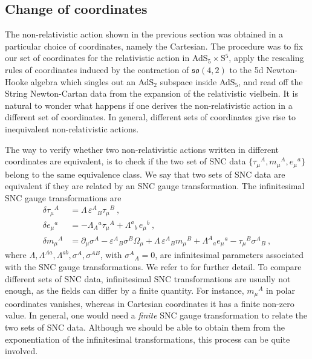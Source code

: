 \documentclass[12pt]{article}
\numberwithin{equation}{section}
\begin{document}
\subsection{Change of coordinates}

The non-relativistic action shown in the previous section was obtained in a particular choice of coordinates, namely the Cartesian. The procedure was to fix our set of coordinates for the relativistic action in AdS$_5\times$S$^5$, apply the rescaling rules of coordinates induced by the contraction of $\mathfrak{so}(4,2)$ to the 5d Newton-Hooke algebra which singles out an AdS$_2$ subspace inside AdS$_5$, and read off the String Newton-Cartan data from the expansion of the relativistic vielbein. It is natural to wonder what happens if one derives the non-relativistic action in a different set of coordinates. In general, different sets of coordinates give rise to inequivalent non-relativistic actions.

The way to verify whether two non-relativistic actions written in different coordinates are equivalent, is to check if the two set of SNC data $\{ \tau_{\mu}{}^A, m_{\mu}{}^A, e_{\mu}{}^a \}$ belong to the same equivalence class. We say that two sets of SNC data are equivalent if they are related by an SNC gauge transformation.
The infinitesimal SNC gauge transformations are
\begin{align}
     \delta \tau_{\mu}{}^A &= \Lambda \,\varepsilon^A{}_B \tau_{\mu}{}^B \ ,  \\
     \delta e_\mu{}^{a} &= - \Lambda_A{}^{a} \tau_\mu{}^A + \Lambda^{a}{}_{b} \, e_\mu{}^{b}\ , \\
     \delta m_\mu{}^A  &= \partial_\mu \sigma^A - \varepsilon^A{}_B \sigma^B \Omega_\mu + \Lambda \, \varepsilon^A{}_B m_\mu{}^B + \Lambda^{A}{}_a e_{\mu}{}^a - \tau_\mu{}^B \sigma^A{}_B \ ,
\end{align}
where $\Lambda, \Lambda^{Aa}, \Lambda^{ab}, \sigma^A, \sigma^{AB}$, with $\sigma^A{}_A = 0$, are infinitesimal parameters associated with the SNC gauge transformations. We refer to \cite{Bergshoeff:2019pij} for further detail. To compare different sets of SNC data, infinitesimal SNC transformations are usually not enough, as the fields can differ by a finite quantity. For instance, $m_{\mu}{}^A$ in polar coordinates vanishes, whereas in Cartesian coordinates it has a finite non-zero value. 
In general, one would need a \emph{finite} SNC gauge transformation to relate the two sets of SNC data. Although we should be able to obtain them from the exponentiation of the infinitesimal transformations, this process can be quite involved. 
    
\end{document}
